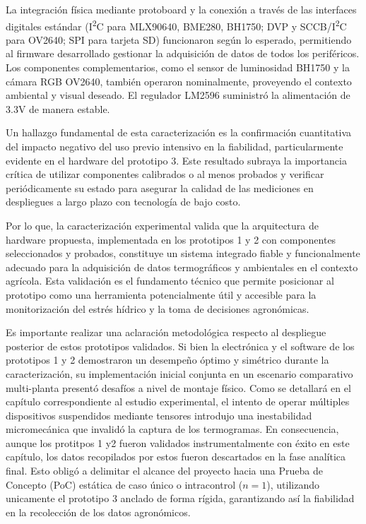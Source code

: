 La integración física mediante protoboard y la conexión a través de las interfaces digitales estándar (I\textsuperscript{2}C para MLX90640, BME280, BH1750; DVP y SCCB/I\textsuperscript{2}C para OV2640; SPI para tarjeta SD) funcionaron según lo esperado, permitiendo al firmware desarrollado gestionar la adquisición de datos de todos los periféricos. Los componentes complementarios, como el sensor de luminosidad BH1750 y la cámara RGB OV2640, también operaron nominalmente, proveyendo el contexto ambiental y visual deseado. El regulador LM2596 suministró la alimentación de 3.3V de manera estable.

Un hallazgo fundamental de esta caracterización es la confirmación cuantitativa del impacto negativo del uso previo intensivo en la fiabilidad, particularmente evidente en el hardware del prototipo 3. Este resultado subraya la importancia crítica de utilizar componentes calibrados o al menos probados y verificar periódicamente su estado para asegurar la calidad de las mediciones en despliegues a largo plazo con tecnología de bajo costo.

Por lo que, la caracterización experimental valida que la arquitectura de hardware propuesta, implementada en los prototipos 1 y 2 con componentes seleccionados y probados, constituye un sistema integrado fiable y funcionalmente adecuado para la adquisición de datos termográficos y ambientales en el contexto agrícola. Esta validación es el fundamento técnico que permite posicionar al prototipo como una herramienta potencialmente útil y accesible para la monitorización del estrés hídrico y la toma de decisiones agronómicas.

Es importante realizar una aclaración metodológica respecto al despliegue posterior de estos prototipos validados. Si bien la electrónica y el software de los prototipos 1 y 2 demostraron un desempeño óptimo y simétrico durante la caracterización, su implementación inicial conjunta en un escenario comparativo multi-planta presentó desafíos a nivel de montaje físico. Como se detallará en el capítulo correspondiente al estudio experimental, el intento de operar múltiples dispositivos suspendidos mediante tensores introdujo una inestabilidad micromecánica que invalidó la captura de los termogramas. En consecuencia, aunque los protitpos 1 y2 fueron validados instrumentalmente con éxito en este capítulo, los datos recopilados por estos fueron descartados en la fase analítica final. Esto obligó a delimitar el alcance del proyecto hacia una Prueba de Concepto (PoC) estática de caso único o intracontrol ($n=1$), utilizando unicamente el prototipo 3 anclado de forma rígida, garantizando así la fiabilidad en la recolección de los datos agronómicos.

